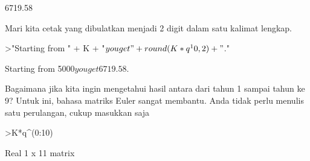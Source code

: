 \begin{eulernotebook}
\begin{eulercomment}
\begin{eulercomment}
\begin{euleroutput}
      6719.58 
\end{euleroutput}
\begin{eulercomment}
Mari kita cetak yang dibulatkan menjadi 2 digit dalam satu kalimat
lengkap.
\end{eulercomment}
\begin{eulerprompt}
>"Starting from " + K + "$ you get " + round(K*q^10,2) + "$."
\end{eulerprompt}
\begin{euleroutput}
  Starting from 5000$ you get 6719.58$.
\end{euleroutput}
\begin{eulercomment}
Bagaimana jika kita ingin mengetahui hasil antara dari tahun 1 sampai
tahun ke 9? Untuk ini, bahasa matriks Euler sangat membantu. Anda
tidak perlu menulis satu perulangan, cukup masukkan saja
\end{eulercomment}
\begin{eulerprompt}
>K*q^(0:10)
\end{eulerprompt}
\begin{euleroutput}
  Real 1 x 11 matrix
  

\end{euleroutput}
\end{eulercomment}
\end{eulercomment}
\end{eulernotebook}
